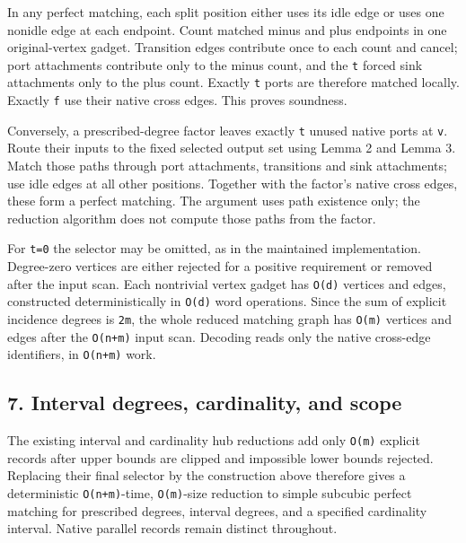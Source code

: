 In any perfect matching, each split position either uses its idle edge or uses one nonidle edge at each endpoint. Count matched minus and plus endpoints in one original-vertex gadget. Transition edges contribute once to each count and cancel; port attachments contribute only to the minus count, and the \texttt{t} forced sink attachments only to the plus count. Exactly \texttt{t} ports are therefore matched locally. Exactly \texttt{f} use their native cross edges. This proves soundness.

Conversely, a prescribed-degree factor leaves exactly \texttt{t} unused native ports at \texttt{v}. Route their inputs to the fixed selected output set using Lemma 2 and Lemma 3. Match those paths through port attachments, transitions and sink attachments; use idle edges at all other positions. Together with the factor's native cross edges, these form a perfect matching. The argument uses path existence only; the reduction algorithm does not compute those paths from the factor.

For \texttt{t=0} the selector may be omitted, as in the maintained implementation. Degree-zero vertices are either rejected for a positive requirement or removed after the input scan. Each nontrivial vertex gadget has \texttt{O(d)} vertices and edges, constructed deterministically in \texttt{O(d)} word operations. Since the sum of explicit incidence degrees is \texttt{2m}, the whole reduced matching graph has \texttt{O(m)} vertices and edges after the \texttt{O(n+m)} input scan. Decoding reads only the native cross-edge identifiers, in \texttt{O(n+m)} work.

\hypertarget{af-a1dc8f9b11-interval-degrees-cardinality-and-scope}{%
\subsection{7. Interval degrees, cardinality, and scope}\label{af-a1dc8f9b11-interval-degrees-cardinality-and-scope}}

The existing interval and cardinality hub reductions add only \texttt{O(m)} explicit records after upper bounds are clipped and impossible lower bounds rejected. Replacing their final selector by the construction above therefore gives a deterministic \texttt{O(n+m)}-time, \texttt{O(m)}-size reduction to simple subcubic perfect matching for prescribed degrees, interval degrees, and a specified cardinality interval. Native parallel records remain distinct throughout.

